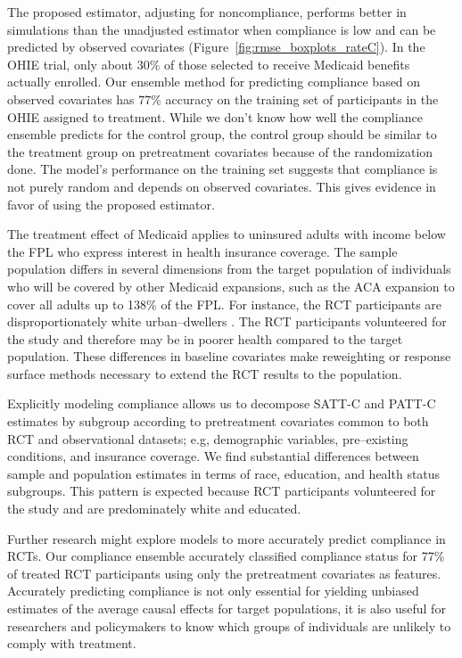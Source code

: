 \documentclass[hidelinks,12pt]{article}
\begin{document}
{The proposed estimator, adjusting for noncompliance, performs better in simulations than the unadjusted estimator when compliance is low and can be predicted by observed covariates (Figure~\ref{fig:rmse_boxplots_rateC}). In the OHIE trial, only about $30\%$ of those selected to receive Medicaid benefits actually enrolled. Our ensemble method for predicting compliance based on observed covariates has $77\%$ accuracy on the training set of participants in the OHIE assigned to treatment. While we don't know how well the compliance ensemble predicts for the control group, the control group should be similar to the treatment group on pretreatment covariates because of the randomization done. The model's performance on the training set suggests that compliance is not purely random and depends on observed covariates. This gives evidence in favor of using the proposed estimator. 

The treatment effect of Medicaid applies to uninsured adults with income below the FPL who express interest in health insurance coverage. The sample population differs in several dimensions from the target population of individuals who will be covered by other Medicaid expansions, such as the ACA expansion to cover all adults up to 138\% of the FPL. For instance, the RCT participants are disproportionately white urban--dwellers \citep{Taubman}. The RCT participants volunteered for the study and therefore may be in poorer health compared to the target population. These differences in baseline covariates make {\color{red}reweighting or response surface methods} necessary to extend the RCT results to the population.

Explicitly modeling compliance allows us to decompose SATT-C and PATT-C estimates by subgroup according to pretreatment covariates common to both RCT and observational datasets{\color{red}; e.g, demographic variables, pre--existing conditions, and insurance coverage}. We find substantial differences between sample and population estimates in terms of race, education, and health status subgroups. This pattern is expected because RCT participants volunteered for the study and are predominately white and educated.

Further research might explore models to more accurately predict compliance in RCTs. Our compliance ensemble accurately classified compliance status for 77\% of treated RCT participants using only the pretreatment covariates as features. Accurately predicting compliance is not only essential for yielding unbiased estimates of the average causal effects for target populations, it is also useful for researchers and policymakers to know which groups of individuals are unlikely to comply with treatment. 

}
\end{document}
